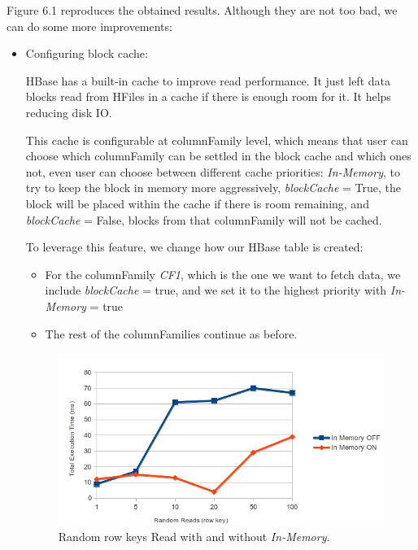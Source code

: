 \bigskip

Figure 6.1 reproduces the obtained results. Although they are not too bad, we can do some more improvements:
\begin{itemize}
\item Configuring block cache:
\par 
HBase has a built-in cache to improve read performance. It just left data blocks read from HFiles in a cache if there is enough room for it. It helps reducing disk IO.
\par
 This cache is configurable at columnFamily level, which means that user can choose which columnFamily can be settled in the block cache and which ones not, even user can choose between different cache priorities: \textit{In-Memory}, to try to keep the block in memory more aggressively, \textit{blockCache} = True, the block will be placed within the cache if there is room remaining, and \textit{blockCache} = False, blocks from that columnFamily will not be cached.
\par 
To leverage this feature, we change how our HBase table is created: 
\begin{itemize}
\item For the columnFamily \textit{CF1}, which is the one we want to fetch data, we include \textit{blockCache} = true, and we set it to the highest priority with \textit{In-Memory} = true
\item The rest of the columnFamilies continue as before.
\end{itemize}


\begin{figure}[htb]
\centering
\includegraphics[width=1\textwidth]{./images/inMemory2.png}
\caption{Random row keys Read with and without \textit{In-Memory}.} \label{fig:inMemoryReads}
\end{figure}



\end{itemize}
